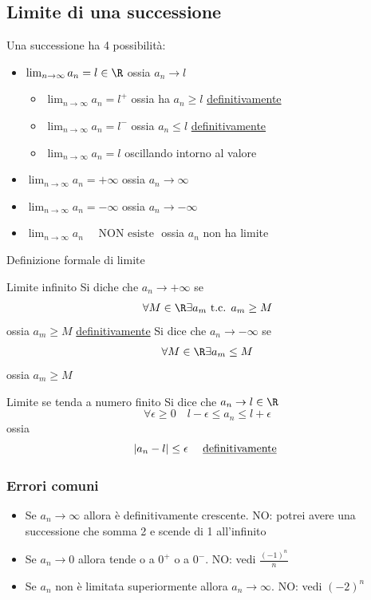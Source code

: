 \subsection{Limite di una successione}
\label{sub:tipilimiti}
Una successione ha 4 possibilità:
\begin{itemize}
	\item $\lim_{n \to \infty} a_n = l \in  \R$ ossia $a_n \to l$
	      \begin{itemize}
		      \item $\lim_{n \to \infty} a_n = l^{+}$ ossia ha $a_n \ge l$ \underline{definitivamente}
		      \item $\lim_{n \to \infty} a_n = l^{-}$ ossia $a_n \le l$ \underline{definitivamente}
		      \item $\lim_{n \to \infty} a_n = l$ oscillando intorno al valore
	      \end{itemize}
	\item $\lim_{n \to \infty} a_n = + \infty$ ossia $a_n \to \infty$
	\item $\lim_{n \to \infty} a_n = - \infty$ ossia $a_n \to -\infty$
	\item $\lim_{n \to \infty} a_n \quad \text{ NON esiste }$ ossia $a_n$ non ha limite
\end{itemize}
Definizione formale di limite

\begin{definizione}{Limite infinito}
	Si diche che $a_n \to + \infty$ se \[
		\forall M \in  \R \exists a_m \text{ t.c. } a_m\ge M
	\]
	ossia $a_m \ge M$ \underline{definitivamente}
	\vskip3mm
	Si dice che $a_n \to -\infty$ se \[
		\forall M \in  \R \exists a_m \le M
	\]
	ossia $a_m \ge M $
\end{definizione}

\begin{definizione}{Limite se tenda a numero finito}
	Si dice che $a_n \to l \in  \R$ \[
		\forall \epsilon \ge 0 \quad l- \epsilon \le a_n \le l+ \epsilon
	\]
	ossia
	\[
		\left|a_n-l\right| \le \epsilon \quad \text{ \underline{definitivamente} }
	\]
\end{definizione}

\subsubsection{Errori comuni}
\begin{itemize}
	\item Se $a_n \to \infty$ allora è definitivamente crescente. NO: potrei avere una successione che somma 2 e scende di 1 all'infinito
	\item Se $a_n \to 0$ allora tende o a $0^{+}$ o a $0^{-}$. NO: vedi $\frac{\left( -1 \right) ^{n}}{n}$
	\item Se $a_n$ non è limitata superiormente allora $a_n \to \infty$. NO: vedi $ \left( -2 \right) ^{n}$
\end{itemize}
